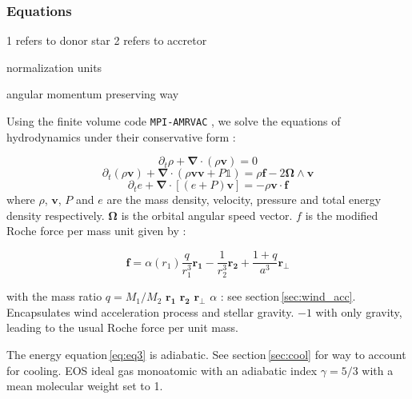 \documentclass[a4paper,fleqn,usenatbib]{mnras}
\begin{document}
\subsubsection{Equations}
\label{sec:HD_eq}

1 refers to donor star
2 refers to accretor

normalization units

angular momentum preserving way

Using the finite volume code \texttt{MPI-AMRVAC} \citep{Xia2017}, we solve the equations of hydrodynamics under their conservative form :

\begin{equation}
\label{eq:eq1}
\partial _t \rho + \boldsymbol{\nabla} \cdot \left( \rho \mathbf{v} \right) = 0
\end{equation}
\begin{equation}
\label{eq:eq2}
\partial _t \left( \rho \mathbf{v} \right) + \boldsymbol {\nabla} \cdot \left( \rho \mathbf{v} \mathbf{v} + P \mathbb{1} \right) = \rho \mathbf{f} - 2 \boldsymbol{\Omega} \wedge \mathbf{v}
\end{equation}
\begin{equation}
\label{eq:eq3}
\partial _t  e  + \boldsymbol{\nabla} \cdot \left[ \left( e + P \right) \mathbf{v} \right] = - \rho \mathbf{v} \cdot \mathbf{f}
\end{equation}
where $\rho$, $\mathbf{v}$, $P$ and $e$ are the mass density, velocity, pressure and total energy density respectively. $\boldsymbol{\Omega}$ is the orbital angular speed vector. $f$ is the modified Roche force per mass unit given by : 

\begin{equation}
\mathbf{f}=\alpha\left( r_1 \right) \frac{q}{r_1^3}\mathbf{r_1} - \frac{1}{r_2^3}\mathbf{r_2} + \frac{1+q}{a^3}\mathbf{r_{\perp}}
\end{equation}

with the mass ratio $q=M_1/M_2$
$\mathbf{r_1}$
$\mathbf{r_2}$
$\mathbf{r_{\perp}}$
$\alpha$ : see section\,\ref{sec:wind_acc}. Encapsulates wind acceleration process and stellar gravity. $-1$ with only gravity, leading to the usual Roche force per unit mass.

The energy equation\,\ref{eq:eq3} is adiabatic. See section\,\ref{sec:cool} for way to account for cooling.
EOS ideal gas monoatomic with an adiabatic index $\gamma=5/3$ with a mean molecular weight set to 1. 
\end{document}
